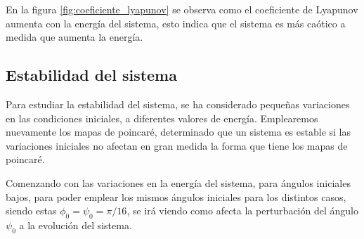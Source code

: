 \documentclass[11pt, twoside]{article} %
\begin{document}
En la figura \ref{fig:coeficiente_lyapunov} se observa como el coeficiente
de Lyapunov aumenta con la energía del sistema, esto indica que el sistema
es más caótico a medida que aumenta la energía.




\subsection{Estabilidad del sistema}

Para estudiar la estabilidad del sistema, se ha considerado pequeñas
variaciones en las condiciones iniciales, a diferentes valores de 
energía. Emplearemos nuevamente los mapas de poincaré, determinado que 
un sistema es estable si las variaciones iniciales no afectan en gran medida
la forma que tiene los mapas de poincaré.

Comenzando con las variaciones en la energía del sistema, para ángulos 
iniciales bajos, para poder emplear los mismos ángulos iniciales para los 
distintos casos, siendo estas $\phi_0 = \psi_0 = \pi/16$, se irá viendo como 
afecta la perturbación del ángulo $\psi_0$ a la evolución del sistema.
\end{document}
